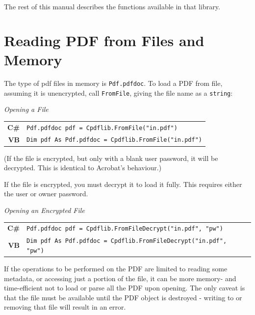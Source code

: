 \documentclass[a4paper]{memoir}
\begin{document}
The rest of this manual describes the functions available in that library.

\section{Reading PDF from Files and Memory}
The type of pdf files in memory is \texttt{Pdf.pdfdoc}. To load a PDF from file, assuming it is unencrypted, call \texttt{FromFile}, giving the file name as a \texttt{string}:
\begin{framed}
\noindent\textit{Opening a File}\\

\noindent\begin{tabular}{rl}
\small\sffamily\textbf{C\#} &
\begin{minipage}{4in}
\small\verb!Pdf.pdfdoc pdf = Cpdflib.FromFile("in.pdf")!
\end{minipage}\\[5mm]
\small\sffamily\textbf{VB} &
\begin{minipage}{4in}
\small\verb!Dim pdf As Pdf.pdfdoc = Cpdflib.FromFile("in.pdf")!
\end{minipage}
\end{tabular}
\end{framed}

(If the file is encrypted, but only with a blank user password, it will be decrypted. This is identical to Acrobat's behaviour.)

If the file is encrypted, you must decrypt it to load it fully. This requires
either the user or owner password.
\begin{framed}
\noindent\textit{Opening an Encrypted File}\\

\noindent\begin{tabular}{rl}
\small\sffamily\textbf{C\#} &
\begin{minipage}{4in}
\small\verb!Pdf.pdfdoc pdf = Cpdflib.FromFileDecrypt("in.pdf", "pw")!
\end{minipage}\\[5mm]
\small\sffamily\textbf{VB} &
\begin{minipage}{4in}
\small\verb!Dim pdf As Pdf.pdfdoc = Cpdflib.FromFileDecrypt("in.pdf", "pw")!
\end{minipage}
\end{tabular}
\end{framed}

If the operations to be performed on the PDF are limited to reading some metadata, or accessing just a portion of the file, it can be more memory- and time-efficient not to load or parse all the PDF upon opening. The only caveat is that the file must be available until the PDF object is destroyed - writing to or removing that file will result in an error.
\end{document}
